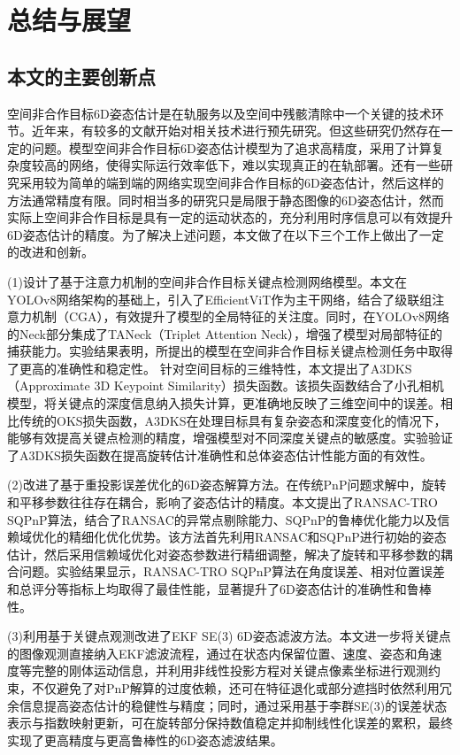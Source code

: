 \chapter{总结与展望}

\section{本文的主要创新点}

空间非合作目标6D姿态估计是在轨服务以及空间中残骸清除中一个关键的技术环节。近年来，有较多的文献开始对相关技术进行预先研究。但这些研究仍然存在一定的问题。模型空间非合作目标6D姿态估计模型为了追求高精度，采用了计算复杂度较高的网络，使得实际运行效率低下，难以实现真正的在轨部署。还有一些研究采用较为简单的端到端的网络实现空间非合作目标的6D姿态估计，然后这样的方法通常精度有限。同时相当多的研究只是局限于静态图像的6D姿态估计，然而实际上空间非合作目标是具有一定的运动状态的，充分利用时序信息可以有效提升6D姿态估计的精度。为了解决上述问题，本文做了在以下三个工作上做出了一定的改进和创新。

	(1)设计了基于注意力机制的空间非合作目标关键点检测网络模型。本文在YOLOv8网络架构的基础上，引入了EfficientViT作为主干网络，结合了级联组注意力机制（CGA），有效提升了模型的全局特征的关注度。同时，在YOLOv8网络的Neck部分集成了TANeck（Triplet Attention Neck），增强了模型对局部特征的捕获能力。实验结果表明，所提出的模型在空间非合作目标关键点检测任务中取得了更高的准确性和稳定性。 针对空间目标的三维特性，本文提出了A3DKS（Approximate 3D Keypoint Similarity）损失函数。该损失函数结合了小孔相机模型，将关键点的深度信息纳入损失计算，更准确地反映了三维空间中的误差。相比传统的OKS损失函数，A3DKS在处理目标具有复杂姿态和深度变化的情况下，能够有效提高关键点检测的精度，增强模型对不同深度关键点的敏感度。实验验证了A3DKS损失函数在提高旋转估计准确性和总体姿态估计性能方面的有效性。
	
	(2)改进了基于重投影误差优化的6D姿态解算方法。在传统PnP问题求解中，旋转和平移参数往往存在耦合，影响了姿态估计的精度。本文提出了RANSAC-TRO SQPnP算法，结合了RANSAC的异常点剔除能力、SQPnP的鲁棒优化能力以及信赖域优化的精细化优化优势。该方法首先利用RANSAC和SQPnP进行初始的姿态估计，然后采用信赖域优化对姿态参数进行精细调整，解决了旋转和平移参数的耦合问题。实验结果显示，RANSAC-TRO SQPnP算法在角度误差、相对位置误差和总评分等指标上均取得了最佳性能，显著提升了6D姿态估计的准确性和鲁棒性。
	
	(3)利用基于关键点观测改进了EKF SE(3) 6D姿态滤波方法。本文进一步将关键点的图像观测直接纳入EKF滤波流程，通过在状态内保留位置、速度、姿态和角速度等完整的刚体运动信息，并利用非线性投影方程对关键点像素坐标进行观测约束，不仅避免了对PnP解算的过度依赖，还可在特征退化或部分遮挡时依然利用冗余信息提高姿态估计的稳健性与精度；同时，通过采用基于李群SE(3)的误差状态表示与指数映射更新，可在旋转部分保持数值稳定并抑制线性化误差的累积，最终实现了更高精度与更高鲁棒性的6D姿态滤波结果。

